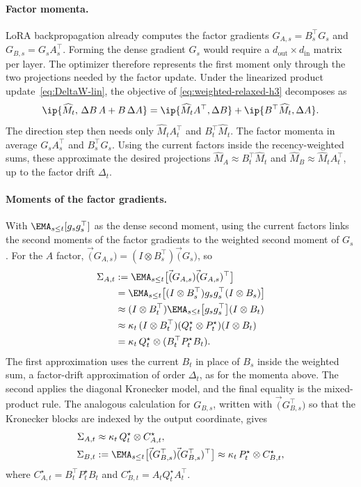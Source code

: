 \paragraph{Factor momenta.}
LoRA backpropagation already computes the factor gradients
$G_{A,s}=B_s^\top G_s$ and $G_{B,s}=G_sA_s^\top$. Forming the dense
gradient $G_s$ would require a $d_{\mathrm{out}}\times d_{\mathrm{in}}$
matrix per layer. The optimizer therefore represents the first moment only
through the two projections needed by the factor update. Under the
linearized product update~\eqref{eq:DeltaW-lin}, the objective of
\eqref{eq:weighted-relaxed-h3} decomposes as
\[
  \ip{\widehat M_t,\,\Delta B\,A+B\,\Delta A}
  =
  \ip{\widehat M_tA^\top,\Delta B}
  +
  \ip{B^\top\widehat M_t,\Delta A}.
\]
The direction step then needs only $\widehat M_tA_t^\top$ and
$B_t^\top\widehat M_t$. The factor momenta in  average
$G_sA_s^\top$ and $B_s^\top G_s$. Using the current factors inside the
recency-weighted sums, these approximate the desired projections
$\widehat M_A\approx B_t^\top\widehat M_t$ and
$\widehat M_B\approx \widehat M_tA_t^\top$, up to the factor drift $\Delta_t$.

\paragraph{Moments of the factor gradients.}
With $\EMA_{s\le t}[g_sg_s^\top]$ as the dense second moment, using the
current factors links the second moments of the factor gradients to
the weighted second moment of $G_s$. For the $A$ factor,
$\vec(G_{A,s})=(I\otimes B_s^\top)\vec(G_s)$, so
\begin{align*}
 \Sigma_{A,t}
 &:= \EMA_{s\le t}\big[\vec(G_{A,s})\vec(G_{A,s})^\top\big] \\
 &= \EMA_{s\le t}\big[
      (I\otimes B_s^\top)g_sg_s^\top(I\otimes B_s)
    \big] \\
 &\approx
    (I\otimes B_t^\top)
    \EMA_{s\le t}\big[g_sg_s^\top\big]
    (I\otimes B_t) \\
 &\approx
    \kappa_t\,(I\otimes B_t^\top)
    (Q^\star_t\otimes P^\star_t)
    (I\otimes B_t) \\
 &= \kappa_t\,Q^\star_t\otimes(B_t^\top P^\star_tB_t).
\end{align*}
The first approximation uses the current $B_t$ in place of $B_s$ inside the
weighted sum, a factor-drift approximation of order $\Delta_t$, as for the
momenta above. The second applies the
diagonal Kronecker model, and the final equality is the mixed-product rule. The analogous calculation for $G_{B,s}$, written with
$\vec(G_{B,s}^\top)$ so that the Kronecker blocks are indexed by the output
coordinate, gives
\begin{align}
  \Sigma_{A,t}
    &\approx \kappa_t\,Q^\star_t\otimes C^\star_{A,t},
  \nonumber \\
  \Sigma_{B,t}
    &:= \EMA_{s\le t}\big[
      \vec(G_{B,s}^\top)\vec(G_{B,s}^\top)^\top
    \big]
    \approx \kappa_t\,P^\star_t\otimes C^\star_{B,t},
  \label{eq:observable-moments-h3}
\end{align}
where
$C^\star_{A,t}=B_t^\top P^\star_tB_t$ and
$C^\star_{B,t}=A_tQ^\star_tA_t^\top$.


